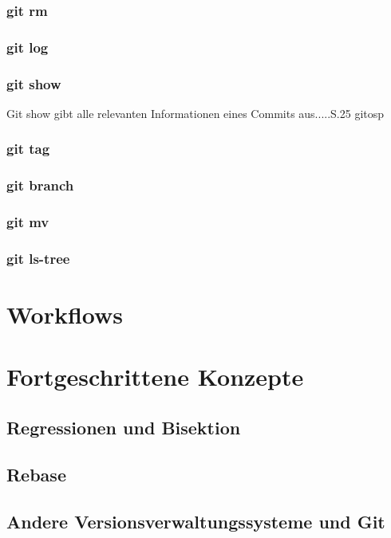 \subsubsection{git rm}

\subsubsection{git log}\label{sec:gitlog}
\subsubsection{git show}\label{sec:gitshow}
Git show gibt alle relevanten Informationen eines Commits aus.....S.25 gitosp
\subsubsection{git tag}
\subsubsection{git branch}
\subsubsection{git mv}
\subsubsection{git ls-tree}

\section{Workflows}\label{sec:Workflows}
\section{Fortgeschrittene Konzepte}
\label{sec:FortgeschritteneKonzepte}
\subsection{Regressionen und Bisektion}\label{sec:bisec}
\subsection{Rebase}\label{sec:rebase}
\subsection{Andere Versionsverwaltungssysteme und Git}
\label{sec:AndereVersionsverwaltungssystemeundGit}
